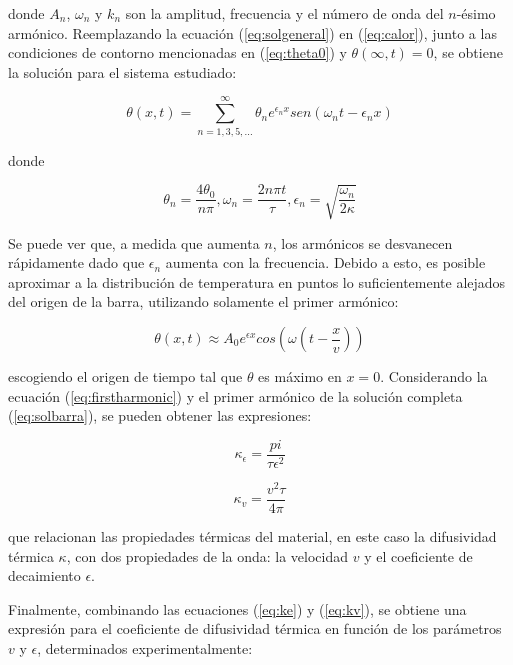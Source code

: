 \documentclass[twoside,twocolumn,a4paper]{article}
\begin{document}
donde $A_{n}$, $\omega_{n}$ y $k_{n}$ son la amplitud, frecuencia y el n\'umero de onda del $n$-\'esimo arm\'onico. Reemplazando la ecuaci\'on (\ref{eq:solgeneral}) en (\ref{eq:calor}), junto a las condiciones de contorno mencionadas en (\ref{eq:theta0}) y $\theta(\infty,t) = 0$, se obtiene la soluci\'on para el sistema estudiado:

\begin{equation}
\label{eq:solbarra}
\theta(x,t) = \sum_{n = 1, 3, 5, ...}^{\infty} \theta_{n}e^{\epsilon_{n}x} sen(\omega_{n}t - \epsilon_{n}x)
\end{equation}

donde

\begin{equation}
\label{eq:conds}
\theta_{n} = \frac{4\theta_{0}}{n\pi}, \omega_{n} = \frac{2n\pi t}{\tau}, \epsilon_{n} = \sqrt{\frac{\omega_{n}}{2\kappa}}
\end{equation}


Se puede ver que, a medida que aumenta $n$, los arm\'onicos se desvanecen r\'apidamente dado que $\epsilon_{n}$ aumenta con la frecuencia. Debido a esto, es posible aproximar a la distribuci\'on de temperatura en puntos lo suficientemente alejados del origen de la barra, utilizando solamente el primer arm\'onico:

\begin{equation}
\label{eq:firstharmonic}
\theta(x,t) \approx A_{0}e^{\epsilon x} cos(\omega(t - \frac{x}{v}))
\end{equation}

escogiendo el origen de tiempo tal que $\theta$ es m\'aximo en $ x = 0$. Considerando la ecuaci\'on (\ref{eq:firstharmonic}) y el primer arm\'onico de la soluci\'on completa (\ref{eq:solbarra}), se pueden obtener las expresiones:

\begin{equation}
\label{eq:ke}
\kappa_{\epsilon} = \frac{pi}{\tau \epsilon^{2}}
\end{equation}

\begin{equation}
\label{eq:kv}
\kappa_{v} = \frac{v^{2} \tau}{4\pi}
\end{equation}


que relacionan las propiedades t\'ermicas del material, en este caso la difusividad t\'ermica $\kappa$, con dos propiedades de la onda: la velocidad $v$ y el coeficiente de decaimiento $\epsilon$. \newline

\par
Finalmente, combinando las ecuaciones (\ref{eq:ke}) y (\ref{eq:kv}), se obtiene una expresi\'on para el coeficiente de difusividad t\'ermica en funci\'on de los par\'ametros $v$ y $\epsilon$, determinados experimentalmente:
\end{document}
